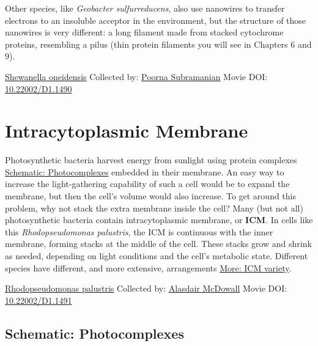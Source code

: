 \documentclass[]{tufte-book}
\begin{document}
Other species, like \emph{Geobacter sulfurreducens}, also use nanowires to transfer electrons to an insoluble acceptor in the environment, but the structure of those nanowires is very different: a long filament made from stacked cytochrome proteins, resembling a pilus (thin protein filaments you will see in Chapters 6 and 9).



\hypertarget{htmlwidget-4f93d80276db71e45b1b}{}

\label{fig:4-2}\protect\hyperlink{tree}{Shewanella oneidensis} Collected by: \protect\hyperlink{poorna_subramanian}{Poorna Subramanian} Movie DOI: \href{https://doi.org/10.22002/D1.1490}{10.22002/D1.1490}

\hypertarget{intracytoplasmic-membrane}{%
\section{Intracytoplasmic Membrane}\label{intracytoplasmic-membrane}}

Photosynthetic bacteria harvest energy from sunlight using protein complexes \protect\hyperlink{Photocomplexes}{Schematic: Photocomplexes} embedded in their membrane. An easy way to increase the light-gathering capability of such a cell would be to expand the membrane, but then the cell's volume would also increase. To get around this problem, why not stack the extra membrane inside the cell? Many (but not all) photosynthetic bacteria contain intracytoplasmic membrane, or \textbf{ICM}. In cells like this \emph{Rhodopseudomonas palustris}, the ICM is continuous with the inner membrane, forming stacks at the middle of the cell. These stacks grow and shrink as needed, depending on light conditions and the cell's metabolic state. Different species have different, and more extensive, arrangements \protect\hyperlink{ICM_variety}{More: ICM variety}.



\hypertarget{htmlwidget-e8c7943b877bbf9fb507}{}

\label{fig:4-3}\protect\hyperlink{tree}{Rhodopseudomonas palustris} Collected by: \protect\hyperlink{alasdair_mcdowall}{Alasdair McDowall} Movie DOI: \href{https://doi.org/10.22002/D1.1491}{10.22002/D1.1491}

\hypertarget{Photocomplexes}{%
\subsection*{Schematic: Photocomplexes}\label{Photocomplexes}}
\end{document}
